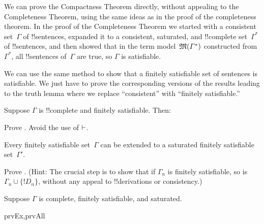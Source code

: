 \documentclass[../../../include/open-logic-section]{subfiles}
\begin{document}

We can prove the Compactness Theorem directly, without appealing to
the Completeness Theorem, using the same ideas as in the proof of the
completeness theorem.  In the proof of the Completeness Theorem we
started with a consistent set~$\Gamma$ of !!{sentence}s, expanded it to a
consistent, saturated, and !!{complete} set~$\Gamma^*$ of
!!{sentence}s, and then showed that in the term
model~$\mathfrak M(\Gamma^*)$ constructed from $\Gamma^*$, all
!!{sentence}s of~$\Gamma$ are true, so $\Gamma$ is satisfiable.

We can use the same method to show that a finitely satisfiable set of
sentences is satisfiable. We just have to prove the corresponding
versions of the results leading to the truth lemma where we replace
``consistent'' with ``finitely satisfiable.''

\begin{prop}
Suppose $\Gamma$ is !!{complete} and finitely satisfiable. Then:
\begin{enumerate}


\end{enumerate}
\end{prop}

\begin{prob}
Prove . Avoid the use of $\Proves$.
\end{prob}

\begin{lem}
 Every finitely satisfiable set~$\Gamma$ can
be extended to a saturated finitely satisfiable set~$\Gamma'$.
\end{lem}

\begin{prob}
Prove . (Hint: The crucial step
is to show that if $\Gamma_n$ is finitely satisfiable, so is $\Gamma_n
\cup \{!D_n\}$, without any appeal to !!{derivation}s or consistency.)
\end{prob}

\begin{prop}
Suppose $\Gamma$ is complete, finitely satisfiable, and saturated.
\begin{tagenumerate}{prvEx,prvAll}
\end{tagenumerate}
\end{prop}
\end{document}
